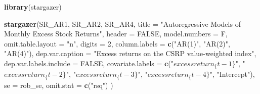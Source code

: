 \documentclass[]{book}
\newenvironment{Shaded}{\begin{snugshade}}{\end{snugshade}}
\newcommand{\KeywordTok}[1]{\textcolor[rgb]{0.13,0.29,0.53}{\textbf{#1}}}
\newcommand{\DataTypeTok}[1]{\textcolor[rgb]{0.13,0.29,0.53}{#1}}
\newcommand{\DecValTok}[1]{\textcolor[rgb]{0.00,0.00,0.81}{#1}}
\newcommand{\StringTok}[1]{\textcolor[rgb]{0.31,0.60,0.02}{#1}}
\newcommand{\OtherTok}[1]{\textcolor[rgb]{0.56,0.35,0.01}{#1}}
\newcommand{\NormalTok}[1]{#1}
\theoremstyle{definition}
\theoremstyle{definition}
\theoremstyle{definition}
\theoremstyle{remark}
\begin{document}
\begin{Shaded}
\begin{Highlighting}[]
\KeywordTok{library}\NormalTok{(stargazer)}

\KeywordTok{stargazer}\NormalTok{(SR_AR1, SR_AR2, SR_AR4,}
  \DataTypeTok{title =} \StringTok{"Autoregressive Models of Monthly Excess Stock Returns"}\NormalTok{,}
  \DataTypeTok{header =} \OtherTok{FALSE}\NormalTok{, }
  \DataTypeTok{model.numbers =}\NormalTok{ F,}
  \DataTypeTok{omit.table.layout =} \StringTok{"n"}\NormalTok{,}
  \DataTypeTok{digits =} \DecValTok{2}\NormalTok{, }
  \DataTypeTok{column.labels =} \KeywordTok{c}\NormalTok{(}\StringTok{"AR(1)"}\NormalTok{, }\StringTok{"AR(2)"}\NormalTok{, }\StringTok{"AR(4)"}\NormalTok{),}
  \DataTypeTok{dep.var.caption  =} \StringTok{"Excess returns on the CSRP value-weighted index"}\NormalTok{,}
  \DataTypeTok{dep.var.labels.include =} \OtherTok{FALSE}\NormalTok{,}
  \DataTypeTok{covariate.labels =} \KeywordTok{c}\NormalTok{(}\StringTok{"$excess return_\{t-1\}$"}\NormalTok{, }\StringTok{"$excess return_\{t-2\}$"}\NormalTok{, }
                       \StringTok{"$excess return_\{t-3\}$"}\NormalTok{, }\StringTok{"$excess return_\{t-4\}$"}\NormalTok{, }
                       \StringTok{"Intercept"}\NormalTok{),}
  \DataTypeTok{se =}\NormalTok{ rob_se,}
  \DataTypeTok{omit.stat =} \KeywordTok{c}\NormalTok{(}\StringTok{"rsq"}\NormalTok{)}
\NormalTok{  ) }
\end{Highlighting}
\end{Shaded}
\end{document}
